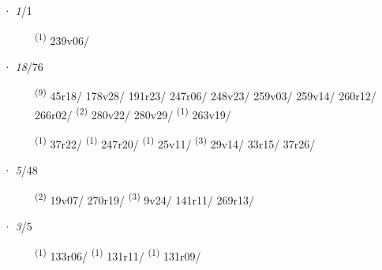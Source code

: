 \noindent{} · \textit{1}/1 \LEMMALINE
\begin{description}
    \item[]  \textsuperscript{(1)} \mbox{239v06/}
\end{description}
\ENTRYEND
\noindent{} · \textit{18}/76 \LEMMALINE
\begin{description}
    \item[]  \textsuperscript{(9)} \mbox{45r18/} \mbox{178v28/} \mbox{191r23/} \mbox{247r06/} \mbox{248v23/} \mbox{259v03/} \mbox{259v14/} \mbox{260r12/} \mbox{266r02/} \CASEBREAK {} \textsuperscript{(2)} \mbox{280v22/} \mbox{280v29/} \CASEBREAK {} \textsuperscript{(1)} \mbox{263v19/}
    \item[]  \textsuperscript{(1)} \mbox{37r22/} \textsuperscript{(1)} \mbox{247r20/} \CASEBREAK {} \textsuperscript{(1)} \mbox{25v11/} \textsuperscript{(3)} \mbox{29v14/} \mbox{33r15/} \mbox{37r26/}
\end{description}
\ENTRYEND
\noindent{} · \textit{5}/48 \LEMMALINE
\begin{description}
    \item[]  \textsuperscript{(2)} \mbox{19v07/} \mbox{270r19/} \CASEBREAK {} \textsuperscript{(3)} \mbox{9v24/} \mbox{141r11/} \mbox{269r13/}
\end{description}
\ENTRYEND
\noindent{} · \textit{3}/5 \LEMMALINE
\begin{description}
    \item[]  \textsuperscript{(1)} \mbox{133r06/} \CASEBREAK {} \textsuperscript{(1)} \mbox{131r11/} \CASEBREAK {} \textsuperscript{(1)} \mbox{131r09/}
\end{description}
